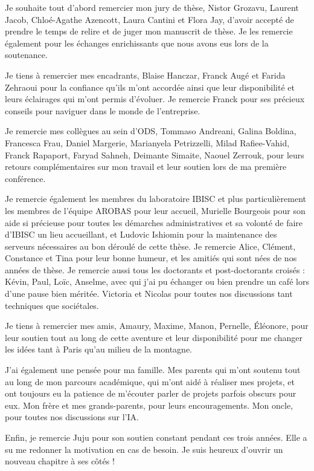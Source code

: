Je souhaite tout d’abord remercier mon jury de thèse, Nistor Grozavu, Laurent Jacob, Chloé-Agathe Azencott, Laura Cantini et Flora Jay, d'avoir accepté de prendre le temps de relire et de juger mon manuscrit de thèse.
Je les remercie également pour les échanges enrichissants que nous avons eus lors de la soutenance.

Je tiens à remercier mes encadrants, Blaise Hanczar, Franck Augé et Farida Zehraoui pour la confiance qu'ils m'ont accordée ainsi que leur disponibilité et leurs éclairages qui m'ont permis d'évoluer.
Je remercie Franck pour ses précieux conseils pour naviguer dans le monde de l'entreprise.

Je remercie mes collègues au sein d'ODS, Tommaso Andreani, Galina Boldina, Francesca Frau, Daniel Margerie, Marianyela Petrizzelli, Milad Rafiee-Vahid, Franck Rapaport, Faryad Sahneh, Deimante Simaite, Naouel Zerrouk, pour leurs retours complémentaires sur mon travail et leur soutien lors de ma première conférence.

Je remercie également les membres du laboratoire IBISC et plus particulièrement les membres de l'équipe AROBAS pour leur accueil, Murielle Bourgeois pour son aide si précieuse pour toutes les démarches administratives et sa volonté de faire d'IBISC un lieu accueillant, et Ludovic Ishiomin pour la maintenance des serveurs nécessaires au bon déroulé de cette thèse.
Je remercie Alice, Clément, Constance et Tina pour leur bonne humeur, et les amitiés qui sont nées de nos années de thèse.
Je remercie aussi tous les doctorants et post-doctorants croisés : Kévin, Paul, Loïc, Anselme, avec qui j'ai pu échanger ou bien prendre un café lors d'une pause bien méritée.
Victoria et Nicolas pour toutes nos discussions tant techniques que sociétales.

Je tiens à remercier mes amis, Amaury, Maxime, Manon, Pernelle, Éléonore, pour leur soutien tout au long de cette aventure et leur disponibilité pour me changer les idées tant à Paris qu'au milieu de la montagne.

J'ai également une pensée pour ma famille.
Mes parents qui m'ont soutenu tout au long de mon parcours académique, qui m'ont aidé à réaliser mes projets, et ont toujours eu la patience de m'écouter parler de projets parfois obscurs pour eux.
Mon frère et mes grands-parents, pour leurs encouragements.
Mon oncle, pour toutes nos discussions sur l'IA.

Enfin, je remercie Juju pour son soutien constant pendant ces trois années.
Elle a su me redonner la motivation en cas de besoin.
Je suis heureux d'ouvrir un nouveau chapitre à ses côtés !